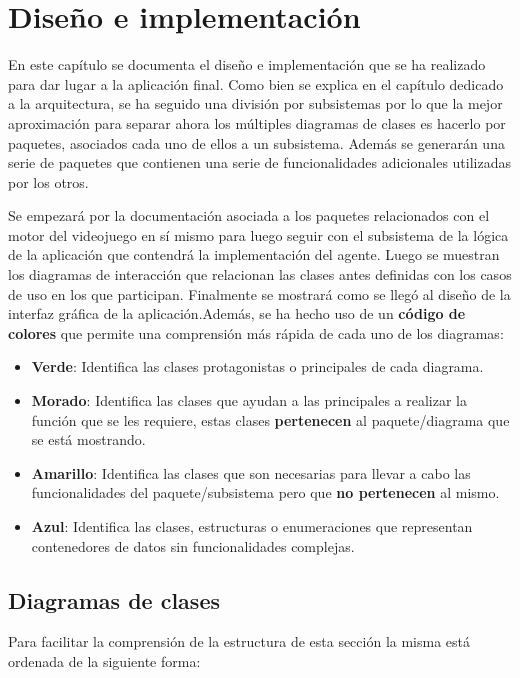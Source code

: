 \chapter{Diseño e implementación}

En este capítulo se documenta el diseño e implementación que se ha realizado para dar lugar a la aplicación final. Como bien se explica en el capítulo dedicado a la arquitectura, se ha seguido una división por subsistemas por lo que la mejor aproximación para separar ahora los múltiples diagramas de clases es hacerlo por paquetes, asociados cada uno de ellos a un subsistema. Además se generarán una serie de paquetes que contienen una serie de funcionalidades adicionales utilizadas por los otros.

\bigskip

Se empezará por la documentación asociada a los paquetes relacionados con el motor del videojuego en sí mismo para luego seguir con el subsistema de la lógica de la aplicación que contendrá la implementación del agente. Luego se muestran los diagramas de interacción que relacionan las clases antes definidas con los casos de uso en los que participan. Finalmente se mostrará como se llegó al diseño de la interfaz gráfica de la aplicación.Además, se ha hecho uso de un \textbf{código de colores} que permite una comprensión más rápida de cada uno de los diagramas:

\begin{itemize}
	\item \textbf{Verde}: Identifica las clases protagonistas o principales de cada diagrama.
	\item \textbf{Morado}: Identifica las clases que ayudan a las principales a realizar la función que se les requiere, estas clases \textbf{pertenecen} al paquete/diagrama que se está mostrando.
	\item \textbf{Amarillo}: Identifica las clases que son necesarias para llevar a cabo las funcionalidades del paquete/subsistema pero que \textbf{no pertenecen} al mismo.
	\item \textbf{Azul}: Identifica las clases, estructuras o enumeraciones que representan contenedores de datos sin funcionalidades complejas.
\end{itemize}

\section{Diagramas de clases}

Para facilitar la comprensión de la estructura de esta sección la misma está ordenada de la siguiente forma:

